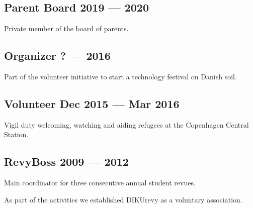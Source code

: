 \vspace{1.5em}
\subsection{{Parent Board \hfill 2019 --- 2020}}
\vspace{1em}
Private member of the board of parents. 

\vspace{1.5em}
\subsection{{Organizer \hfill ? --- 2016}}
\vspace{1em}
Part of the volunteer initiative to start a technology festival on Danish soil.

\vspace{1.5em}
\subsection{{Volunteer \hfill Dec 2015 --- Mar 2016}}
\vspace{1em}
Vigil duty welcoming, watching and aiding refugees at the Copenhagen Central Station.

\vspace{1.5em}
\subsection{{RevyBoss \hfill 2009 --- 2012}}
\vspace{1em}
Main coordinator for three consecutive annual student revues.

As part of the activities we established DIKUrevy as a voluntary association.
